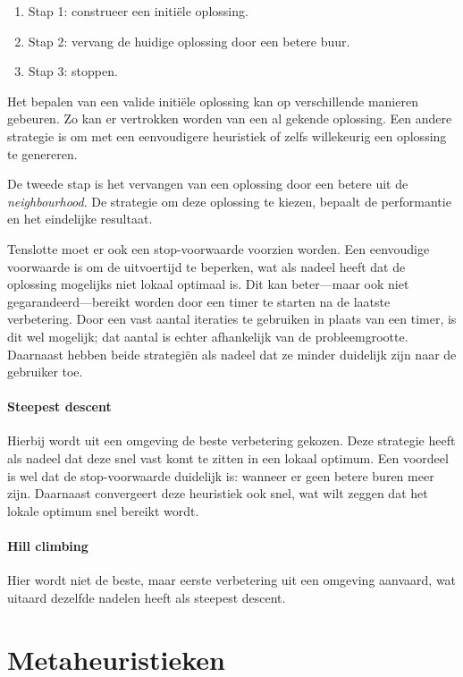 %
\begin{enumerate}
    \item Stap 1: construeer een initi\"ele oplossing.
    \item Stap 2: vervang de huidige oplossing door een betere buur.
    \item Stap 3: stoppen.
\end{enumerate}
%

Het bepalen van een valide initi\"ele oplossing kan op verschillende manieren gebeuren. 
Zo kan er vertrokken worden van een al gekende oplossing. 
Een andere strategie is om met een eenvoudigere heuristiek of zelfs willekeurig een oplossing te genereren.

De tweede stap is het vervangen van een oplossing door een betere uit de \emph{neighbourhood}. 
De strategie om deze oplossing te kiezen, bepaalt de performantie en het eindelijke resultaat.

Tenslotte moet er ook een stop-voorwaarde voorzien worden. 
Een eenvoudige voorwaarde is om de uitvoertijd te beperken, wat als nadeel heeft dat de oplossing mogelijks niet lokaal optimaal is.
Dit kan beter---maar ook niet gegarandeerd---bereikt worden door een timer te starten na de laatste verbetering.
Door een vast aantal iteraties te gebruiken in plaats van een timer, is dit wel mogelijk; dat aantal is echter afhankelijk van de probleemgrootte. 
Daarnaast hebben beide strategi\"en als nadeel dat ze minder duidelijk zijn naar de gebruiker toe. 

\paragraph{Steepest descent}
Hierbij wordt uit een omgeving de beste verbetering gekozen. 
Deze strategie heeft als nadeel dat deze snel vast komt te zitten in een lokaal optimum. Een voordeel is wel dat de stop-voorwaarde duidelijk is: wanneer er geen betere buren meer zijn. Daarnaast convergeert deze heuristiek ook snel, wat wilt zeggen dat het lokale optimum snel bereikt wordt.

\paragraph{Hill climbing}
Hier wordt niet de beste, maar eerste verbetering uit een omgeving aanvaard, wat uitaard dezelfde nadelen heeft als steepest descent.

\section{Metaheuristieken}
